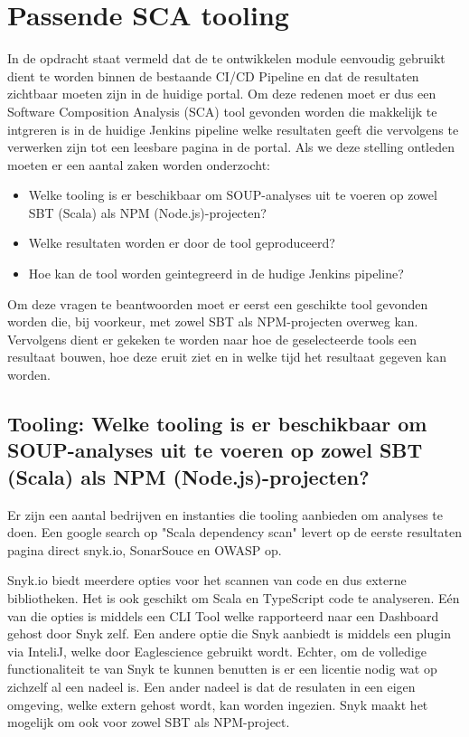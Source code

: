 \section{Passende SCA tooling}\label{sec:sca-tooling}

In de opdracht staat vermeld dat de te ontwikkelen module eenvoudig gebruikt dient te worden binnen de bestaande CI/CD Pipeline en dat de resultaten zichtbaar moeten zijn in de huidige portal. Om deze redenen moet er dus een Software Composition Analysis (SCA) tool gevonden worden die makkelijk te intgreren is in de huidige Jenkins pipeline welke resultaten geeft die vervolgens te verwerken zijn tot een leesbare pagina in de portal. Als we deze stelling ontleden moeten er een aantal zaken worden onderzocht:
\begin{itemize}
    \item Welke tooling is er beschikbaar om SOUP-analyses uit te voeren op zowel SBT (Scala) als NPM (Node.js)-projecten?
    \item Welke resultaten worden er door de tool geproduceerd?
    \item Hoe kan de tool worden geintegreerd in de hudige Jenkins pipeline?
\end{itemize}
Om deze vragen te beantwoorden moet er eerst een geschikte tool gevonden worden die, bij voorkeur, met zowel SBT als NPM-projecten overweg kan. Vervolgens dient er gekeken te worden naar hoe de geselecteerde tools een resultaat bouwen, hoe deze eruit ziet en in welke tijd het resultaat gegeven kan worden.

\subsection{Tooling: Welke tooling is er beschikbaar om SOUP-analyses uit te voeren op zowel SBT (Scala) als NPM (Node.js)-projecten?}\label{subsec:ESTooling}
Er zijn een aantal bedrijven en instanties die tooling aanbieden om analyses te doen. Een google search op "Scala dependency scan" levert op de eerste resultaten pagina direct snyk.io, SonarSouce en OWASP op.

Snyk.io biedt meerdere opties voor het scannen van code en dus externe bibliotheken. Het is ook geschikt om Scala en TypeScript code te analyseren. Eén van die opties is middels een CLI Tool welke rapporteerd naar een Dashboard gehost door Snyk zelf. Een andere optie die Snyk aanbiedt is middels een plugin via InteliJ, welke door Eaglescience gebruikt wordt. Echter, om de volledige functionaliteit te van Snyk te kunnen benutten is er een licentie nodig wat op zichzelf al een nadeel is. Een ander nadeel is dat de resulaten in een eigen omgeving, welke extern gehost wordt, kan worden ingezien. Snyk maakt het mogelijk om ook voor zowel SBT als NPM-project.


